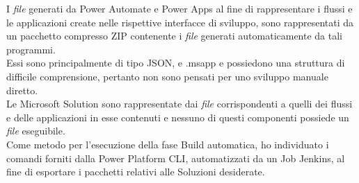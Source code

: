 I \emph{file} generati da Power Automate e Power Apps al fine di rappresentare i flussi e le applicazioni create nelle rispettive interfacce di sviluppo, sono rappresentati da un pacchetto compresso ZIP contenente i \emph{file} generati automaticamente da tali programmi.\\
Essi sono principalmente di tipo JSON, e .msapp e possiedono una struttura di difficile comprensione, pertanto non sono pensati per uno sviluppo manuale diretto.\\
Le Microsoft Solution sono rappresentate dai \emph{file} corrispondenti a quelli dei flussi e delle applicazioni in esse contenuti e nessuno di questi componenti possiede un \emph{file} eseguibile.\\
Come metodo per l'esecuzione della fase Build automatica, ho individuato i comandi forniti dalla Power Platform CLI, automatizzati da un Job Jenkins, al fine di esportare i pacchetti relativi alle Soluzioni desiderate. 

